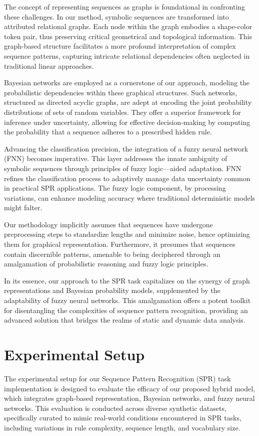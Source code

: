 \documentclass{article}
\begin{document}
The concept of representing sequences as graphs is foundational in confronting these challenges. In our method, symbolic sequences are transformed into attributed relational graphs. Each node within the graph embodies a shape-color token pair, thus preserving critical geometrical and topological information. This graph-based structure facilitates a more profound interpretation of complex sequence patterns, capturing intricate relational dependencies often neglected in traditional linear approaches.

Bayesian networks are employed as a cornerstone of our approach, modeling the probabilistic dependencies within these graphical structures. Such networks, structured as directed acyclic graphs, are adept at encoding the joint probability distributions of sets of random variables. They offer a superior framework for inference under uncertainty, allowing for effective decision-making by computing the probability that a sequence adheres to a prescribed hidden rule.

Advancing the classification precision, the integration of a fuzzy neural network (FNN) becomes imperative. This layer addresses the innate ambiguity of symbolic sequences through principles of fuzzy logic—aided adaptation. FNN refines the classification process to adaptively manage data uncertainty common in practical SPR applications. The fuzzy logic component, by processing variations, can enhance modeling accuracy where traditional deterministic models might falter.

Our methodology implicitly assumes that sequences have undergone preprocessing steps to standardize lengths and minimize noise, hence optimizing them for graphical representation. Furthermore, it presumes that sequences contain discernible patterns, amenable to being deciphered through an amalgamation of probabilistic reasoning and fuzzy logic principles.

In its essence, our approach to the SPR task capitalizes on the synergy of graph representations and Bayesian probability models, supplemented by the adaptability of fuzzy neural networks. This amalgamation offers a potent toolkit for disentangling the complexities of sequence pattern recognition, providing an advanced solution that bridges the realms of static and dynamic data analysis.
\section{Experimental Setup}
The experimental setup for our Sequence Pattern Recognition (SPR) task implementation is designed to evaluate the efficacy of our proposed hybrid model, which integrates graph-based representation, Bayesian networks, and fuzzy neural networks. This evaluation is conducted across diverse synthetic datasets, specifically curated to mimic real-world conditions encountered in SPR tasks, including variations in rule complexity, sequence length, and vocabulary size. 
\end{document}
